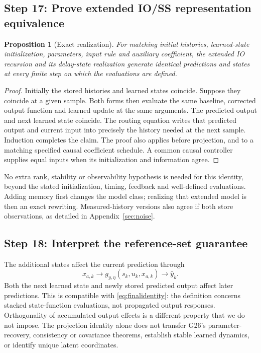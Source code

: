 \documentclass[11pt,a4paper]{article}
\newtheorem{proposition}{Proposition}
\begin{document}
\subsection*{Step 17: Prove extended IO/SS representation equivalence}
\begin{proposition}[Exact realization]\label{prop:equivalence}
For matching initial histories, learned-state initialization, parameters, input rule and auxiliary coefficient, the extended IO recursion and its delay-state realization generate identical predictions and states at every finite step on which the evaluations are defined.
\end{proposition}
\begin{proof}
Initially the stored histories and learned states coincide. Suppose they coincide at a given sample. Both forms then evaluate the same baseline, corrected output function and learned update at the same arguments. The predicted output and next learned state coincide. The routing equation writes that predicted output and current input into precisely the history needed at the next sample. Induction completes the claim. The proof also applies before projection, and to a matching specified causal coefficient schedule. A common causal controller supplies equal inputs when its initialization and information agree.
\end{proof}
No extra rank, stability or observability hypothesis is needed for this identity, beyond the stated initialization, timing, feedback and well-defined evaluations. Adding memory first changes the model class; realizing that extended model is then an exact rewriting. Measured-history versions also agree if both store observations, as detailed in Appendix~\ref{sec:noise}.

\subsection*{Step 18: Interpret the reference-set guarantee}
The additional states affect the current prediction through
\begin{equation}\label{eq:memorypath}
x_{a,k}\longrightarrow g_{y,\eta}(s_k,u_k,x_{a,k})\longrightarrow\hat y_k.
\end{equation}
Both the next learned state and newly stored predicted output affect later predictions. This is compatible with \eqref{eq:finalidentity}: the definition concerns stacked state-function evaluations, not propagated output responses. Orthogonality of accumulated output effects is a different property that we do not impose. The projection identity alone does not transfer G26's parameter-recovery, consistency or covariance theorems, establish stable learned dynamics, or identify unique latent coordinates.
\end{document}
